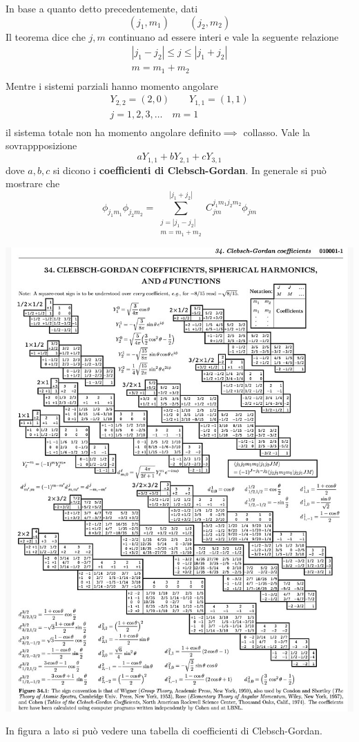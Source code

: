 In base a quanto detto precedentemente, dati \[
	(j_{1},m_{1}) \qquad (j_{2},m_{2})
\] Il teorema dice che \(j,m\) continuano ad essere interi e vale la
seguente relazione \begin{gather*}
	| j_{1} - j_{2}| \leq j \leq | j_{1} + j_{2} |\\
	m = m_{1} + m_{2}\\
\end{gather*} Mentre i sistemi parziali hanno momento angolare \begin{gather*}
	Y_{2,2}=(2,0) \qquad Y_{1,1}=(1,1)\\
	j = 1,2,3, \dots \quad m = 1\\
\end{gather*} il sistema totale non ha momento angolare definito\(\implies\)
collasso.
Vale la sovrappposizione \[
	a Y_{1,1}+bY_{2,1}+cY_{3,1}
\] dove \(a,b,c\) si dicono i \textbf{coefficienti di Clebsch-Gordan}.
In generale si può mostrare che \[
	\phi_{j_{1}m_{1}} \phi_{j_{2}m_{2}} = \sum_{\substack{j=| j_{1}-j_{2}| \\ m = m_{1}+m_{2}} }^{| j_{1}+j_{2}|} C_{jm}^{j_{1}m_{1}j_{2}m_{2}} \phi_{jm}
\]
\begin{marginfigure}
	\includegraphics{figs/cl-gord}
	\label{fig:cl-gord}
\end{marginfigure}
In figura a lato si può vedere una tabella di coefficienti di
Clebsch-Gordan.

